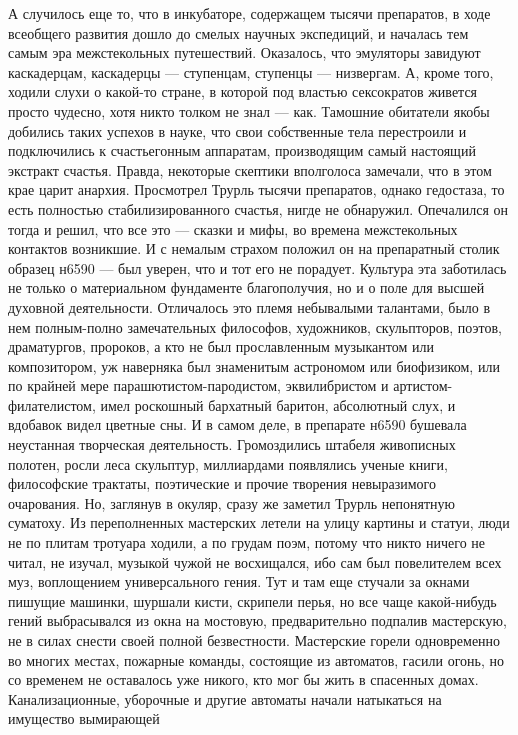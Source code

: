 А случилось еще то, что в инкубаторе, содержащем тысячи
препаратов, в ходе всеобщего развития дошло до смелых
научных экспедиций, и началась тем самым эра межстекольных
путешествий. Оказалось, что эмуляторы завидуют каскадерцам,
каскадерцы --- ступенцам, ступенцы --- низвергам. А, кроме того,
ходили слухи о какой-то стране, в которой под властью
сексократов живется просто чудесно, хотя никто толком не
знал --- как. Тамошние обитатели якобы добились таких успехов
в науке, что свои собственные тела перестроили и
подключились к счастьегонным аппаратам, производящим самый
настоящий экстракт счастья. Правда, некоторые скептики
вполголоса замечали, что в этом крае царит анархия.
Просмотрел Трурль тысячи препаратов, однако гедостаза, то
есть полностью стабилизированного счастья, нигде не
обнаружил. Опечалился он тогда и решил, что все это --- сказки
и мифы, во времена межстекольных контактов возникшие. И с
немалым страхом положил он на препаратный столик образец
н6590 --- был уверен, что и тот его не порадует. Культура эта
заботилась не только о материальном фундаменте благополучия,
но и о поле для высшей духовной деятельности. Отличалось это
племя небывалыми талантами, было в нем полным-полно
замечательных философов, художников, скульпторов, поэтов,
драматургов, пророков, а кто не был прославленным музыкантом
или композитором, уж наверняка был знаменитым астрономом или
биофизиком, или по крайней мере парашютистом-пародистом,
эквилибристом и артистом-филателистом, имел роскошный
бархатный баритон, абсолютный слух, и вдобавок видел цветные
сны. И в самом деле, в препарате н6590 бушевала неустанная
творческая деятельность. Громоздились штабеля живописных
полотен, росли леса скульптур, миллиардами появлялись ученые
книги, философские трактаты, поэтические и прочие творения
невыразимого очарования. Но, заглянув в окуляр, сразу же
заметил Трурль непонятную суматоху. Из переполненных
мастерских летели на улицу картины и статуи, люди не по
плитам тротуара ходили, а по грудам поэм, потому что никто
ничего не читал, не изучал, музыкой чужой не восхищался, ибо
сам был повелителем всех муз, воплощением универсального
гения. Тут и там еще стучали за окнами пишущие машинки,
шуршали кисти, скрипели перья, но все чаще какой-нибудь
гений выбрасывался из окна на мостовую, предварительно
подпалив мастерскую, не в силах снести своей полной
безвестности. Мастерские горели одновременно во многих
местах, пожарные команды, состоящие из автоматов, гасили
огонь, но со временем не оставалось уже никого, кто мог бы
жить в спасенных домах. Канализационные, уборочные и другие
автоматы начали натыкаться на имущество вымирающей
